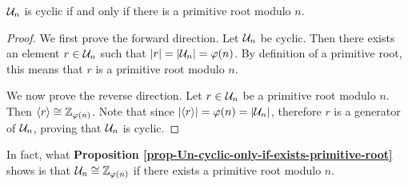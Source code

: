 \begin{proposition}\label{prop-Un-cyclic-only-if-exists-primitive-root}
    $\mathcal{U}_{n}$ is cyclic if and only if there is a primitive root modulo $n$.
\end{proposition}
\begin{proof}
    We first prove the forward direction. Let $\mathcal{U}_{n}$ be cyclic. Then there exists an element $r \in \mathcal{U}_{n}$ such that $|r| = |\mathcal{U}_{n}| = \varphi(n)$. By definition of a primitive root, this means that $r$ is a primitive root modulo $n$.

    We now prove the reverse direction. Let $r \in \mathcal{U}_{n}$ be a primitive root modulo $n$. Then $\langle r \rangle \cong \mathbb{Z}_{\varphi(n)}$. Note that since $|\langle r \rangle| = \varphi(n) = |\mathcal{U}_{n}|$, therefore $r$ is a generator of $\mathcal{U}_{n}$, proving that $\mathcal{U}_{n}$ is cyclic.
\end{proof}
\begin{remark}
    In fact, what \textbf{Proposition \ref{prop-Un-cyclic-only-if-exists-primitive-root}} shows is that $\mathcal{U}_{n} \cong \mathbb{Z}_{\varphi(n)}$ if there exists a primitive root modulo $n$.
\end{remark}

